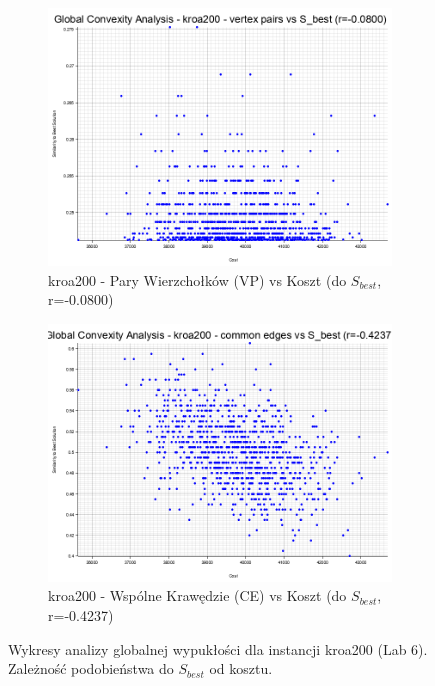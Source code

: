 \documentclass[12pt,a4paper]{article}
\begin{document}
\begin{figure}[H]
\begin{adjustwidth}{-1cm}{-1cm}
    \centering
    \begin{subfigure}[b]{0.8\textwidth}
        \centering
        \includegraphics[width=\textwidth]{output/kroa200_convexity_vertex_pairs_s_best.png}
        \caption{kroa200 - Pary Wierzchołków (VP) vs Koszt (do $S_{best}$, r=-0.0800)}
        \label{fig:kroa200_convexity_vp_sbest}
    \end{subfigure}
    \hfill
    \begin{subfigure}[b]{0.8\textwidth}
        \centering
        \includegraphics[width=\textwidth]{output/kroa200_convexity_common_edges_s_best.png}
        \caption{kroa200 - Wspólne Krawędzie (CE) vs Koszt (do $S_{best}$, r=-0.4237)}
        \label{fig:kroa200_convexity_ce_sbest}
    \end{subfigure}
    \caption{Wykresy analizy globalnej wypukłości dla instancji kroa200 (Lab 6). Zależność podobieństwa do $S_{best}$ od kosztu.}
    \label{fig:kroa200_convexity_sbest_plots}
\end{adjustwidth}
\end{figure}
\end{document}
